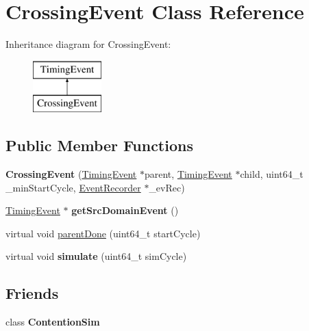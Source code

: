 \hypertarget{classCrossingEvent}{\section{Crossing\-Event Class Reference}
\label{classCrossingEvent}
}
Inheritance diagram for Crossing\-Event\-:\begin{figure}[H]
\begin{center}
\leavevmode
\includegraphics[height=2.000000cm]{classCrossingEvent}
\end{center}
\end{figure}
\subsection*{Public Member Functions}
\begin{DoxyCompactItemize}
\item 
\hypertarget{classCrossingEvent_ab3416373c80cc905faaf615d69b539ed}{{\bfseries Crossing\-Event} (\hyperlink{classTimingEvent}{Timing\-Event} $\ast$parent, \hyperlink{classTimingEvent}{Timing\-Event} $\ast$child, uint64\-\_\-t \-\_\-min\-Start\-Cycle, \hyperlink{classEventRecorder}{Event\-Recorder} $\ast$\-\_\-ev\-Rec)}\label{classCrossingEvent_ab3416373c80cc905faaf615d69b539ed}

\item 
\hypertarget{classCrossingEvent_a275b5945ada8e357a0c07cf2428b9460}{\hyperlink{classTimingEvent}{Timing\-Event} $\ast$ {\bfseries get\-Src\-Domain\-Event} ()}\label{classCrossingEvent_a275b5945ada8e357a0c07cf2428b9460}

\item 
virtual void \hyperlink{classCrossingEvent_a96199fafd70da779df838f73f24cb6b5}{parent\-Done} (uint64\-\_\-t start\-Cycle)
\item 
\hypertarget{classCrossingEvent_a2ca00bf0b21769af20bc64b287bfaf74}{virtual void {\bfseries simulate} (uint64\-\_\-t sim\-Cycle)}\label{classCrossingEvent_a2ca00bf0b21769af20bc64b287bfaf74}

\end{DoxyCompactItemize}
\subsection*{Friends}
\begin{DoxyCompactItemize}
\item 
\hypertarget{classCrossingEvent_a96b81ec5d9f4b197024c5bd08fc10c38}{class {\bfseries Contention\-Sim}}\label{classCrossingEvent_a96b81ec5d9f4b197024c5bd08fc10c38}

\end{DoxyCompactItemize}
